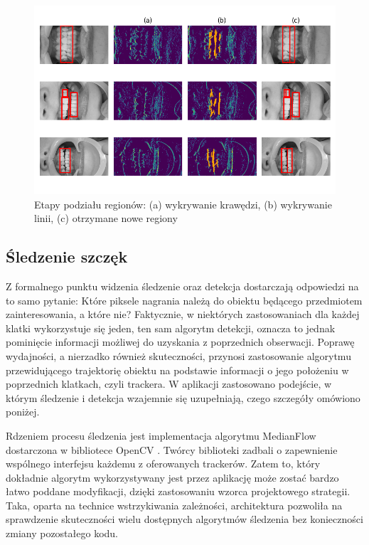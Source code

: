 \begin{figure}
    \centering \includegraphics[width=140mm]{figures/line_split.png}
    \caption{Etapy podziału regionów: (a) wykrywanie krawędzi, (b) wykrywanie linii, (c) otrzymane nowe regiony}
    \label{fig:line_split}
\end{figure}

\subsection{Śledzenie szczęk}

Z formalnego punktu widzenia śledzenie oraz detekcja dostarczają odpowiedzi na to samo pytanie: Które piksele nagrania należą do obiektu będącego przedmiotem zainteresowania, a które nie? Faktycznie, w niektórych zastosowaniach dla każdej klatki wykorzystuje się jeden, ten sam algorytm detekcji, oznacza to jednak pominięcie informacji możliwej do uzyskania z poprzednich obserwacji. Poprawę wydajności, a nierzadko również skuteczności, przynosi zastosowanie algorytmu przewidującego trajektorię obiektu na podstawie informacji o jego położeniu w poprzednich klatkach, czyli trackera. W aplikacji zastosowano podejście, w którym śledzenie i detekcja wzajemnie się uzupełniają, czego szczegóły omówiono poniżej.  

Rdzeniem procesu śledzenia jest implementacja algorytmu MedianFlow dostarczona w bibliotece OpenCV \cite{opencv_trackingAPI}. Twórcy biblioteki zadbali o zapewnienie wspólnego interfejsu każdemu z oferowanych trackerów. Zatem to, który dokładnie algorytm wykorzystywany jest przez aplikację może zostać bardzo łatwo poddane modyfikacji, dzięki zastosowaniu wzorca projektowego strategii. Taka, oparta na technice wstrzykiwania zależności, architektura pozwoliła na sprawdzenie skuteczności wielu dostępnych algorytmów śledzenia bez konieczności zmiany pozostałego kodu.  

